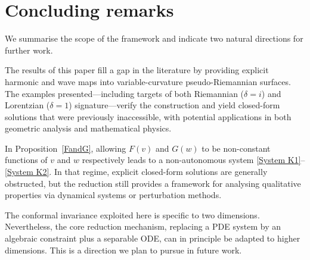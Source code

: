 \documentclass[12pt]{amsart}
\begin{document}
\section{Concluding remarks}

We summarise the scope of the framework and indicate two natural
directions for further work.

The results of this paper fill a gap in the literature by providing 
explicit harmonic and wave maps into variable-curvature 
pseudo-Riemannian surfaces. The examples presented---including 
targets of both Riemannian ($\delta = i$) and Lorentzian 
($\delta = 1$) signature---verify the construction and yield 
closed-form solutions that were previously inaccessible, with 
potential applications in both geometric analysis and mathematical 
physics.


In Proposition~\ref{FandG}, allowing $F(v)$ and $G(w)$ to be
non-constant functions of $v$ and $w$ respectively leads to a
non-autonomous system \eqref{System K1}--\eqref{System K2}. In that
regime, explicit closed-form solutions are generally obstructed, but
the reduction still provides a framework for analysing qualitative
properties via dynamical systems or perturbation methods.


The conformal invariance exploited here is specific to two
dimensions. Nevertheless, the core reduction mechanism, replacing
a PDE system by an algebraic constraint plus a separable ODE, can
in principle be adapted to higher dimensions. This is a direction we plan to pursue in future
work.
\end{document}
